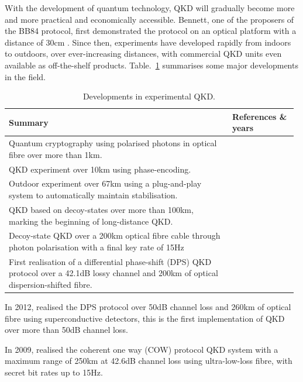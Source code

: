 \documentclass[aps, rmp, twocolumn, amsmath, amssymb, nofootinbib, superscriptaddress, longbibliography, floatfix, table-of-contents, eqsecnum]{revtex4-1}
\newcommand{\comment}[1]{{\color{blue}{\textbf{#1}}}}
\begin{document}
With the development of quantum technology, QKD will gradually become more and more practical and economically accessible. Bennett, one of the proposers of the BB84 protocol, first demonstrated the protocol on an optical platform with a distance of 30cm \cite{bib:JC_5_3}. Since then, experiments have developed rapidly from indoors to outdoors, over ever-increasing distances, with commercial QKD units even available as off-the-shelf products. Table.~\ref{tab:QKD_table} summarises some major developments in the field.

\begin{table}[!htb]
\caption{Developments in experimental QKD.} \label{tab:QKD_table}
\begin{tabular}{|p{0.755\linewidth}|p{0.22\linewidth}|}
	\hline
	Summary & References \& years \\
	\hline \hline
	Quantum cryptography using polarised photons in optical fibre over more than 1km. & \cite{bib:EL_23_383} \\
	\hline
	QKD experiment over 10km using phase-encoding. & \cite{bib:EL_29_634} \\
	\hline
	Outdoor experiment over 67km using a plug-and-play system to automatically maintain stabilisation. & \cite{bib:Arx0203118} \\
	\hline
	QKD based on decoy-states over more than 100km, marking the beginning of long-distance QKD. & \cite{bib:PRL_98_010505, bib:PRL_09_010503x, bib:PRL_98_010504} \\
	\hline
	Decoy-state QKD over a 200km optical fibre cable through photon polarisation with a final key rate of 15Hz & \cite{bib:OptExp_18_8587} \\
	\hline
	First realisation of a differential phase-shift (DPS) QKD protocol over a 42.1dB lossy channel and 200km of optical dispersion-shifted fibre. & \cite{bib:NP_1_343} \\
	\hline
\end{tabular}
\end{table}

\comment{Up to here}

In 2012, \cite{bib:OL_37_1008} realised the DPS protocol over 50dB channel loss and 260km of optical fibre using superconductive detectors, this is the first implementation of QKD over more than 50dB channel loss.

In 2009, \cite{bib:NJP_11_075003} realised the coherent one way (COW) protocol QKD system with a maximum range of 250km at 42.6dB channel loss using ultra-low-loss fibre, with secret bit rates up to 15Hz.
 
\end{document}
